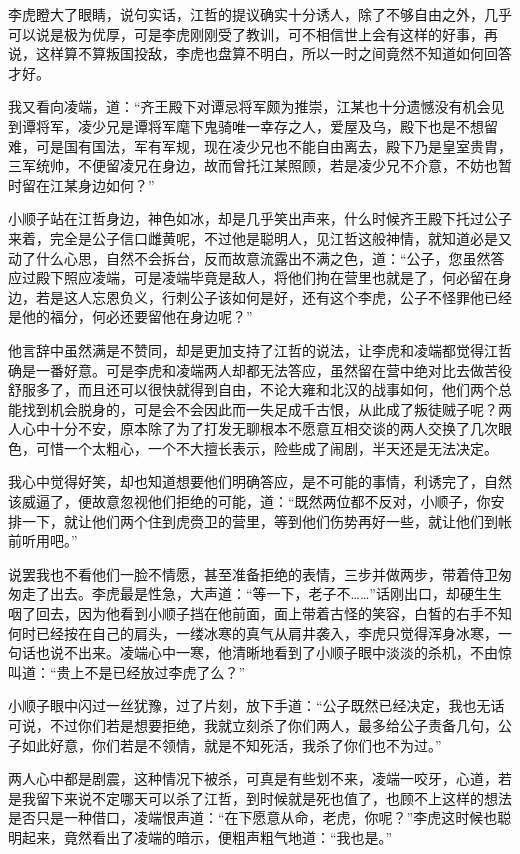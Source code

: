 李虎瞪大了眼睛，说句实话，江哲的提议确实十分诱人，除了不够自由之外，几乎可以说是极为优厚，可是李虎刚刚受了教训，可不相信世上会有这样的好事，再说，这样算不算叛国投敌，李虎也盘算不明白，所以一时之间竟然不知道如何回答才好。

我又看向凌端，道：“齐王殿下对谭忌将军颇为推崇，江某也十分遗憾没有机会见到谭将军，凌少兄是谭将军麾下鬼骑唯一幸存之人，爱屋及乌，殿下也是不想留难，可是国有国法，军有军规，现在凌少兄也不能自由离去，殿下乃是皇室贵胄，三军统帅，不便留凌兄在身边，故而曾托江某照顾，若是凌少兄不介意，不妨也暂时留在江某身边如何？”

小顺子站在江哲身边，神色如冰，却是几乎笑出声来，什么时候齐王殿下托过公子来着，完全是公子信口雌黄呢，不过他是聪明人，见江哲这般神情，就知道必是又动了什么心思，自然不会拆台，反而故意流露出不满之色，道：“公子，您虽然答应过殿下照应凌端，可是凌端毕竟是敌人，将他们拘在营里也就是了，何必留在身边，若是这人忘恩负义，行刺公子该如何是好，还有这个李虎，公子不怪罪他已经是他的福分，何必还要留他在身边呢？”

他言辞中虽然满是不赞同，却是更加支持了江哲的说法，让李虎和凌端都觉得江哲确是一番好意。可是李虎和凌端两人却都无法答应，虽然留在营中绝对比去做苦役舒服多了，而且还可以很快就得到自由，不论大雍和北汉的战事如何，他们两个总能找到机会脱身的，可是会不会因此而一失足成千古恨，从此成了叛徒贼子呢？两人心中十分不安，原本除了为了打发无聊根本不愿意互相交谈的两人交换了几次眼色，可惜一个太粗心，一个不大擅长表示，险些成了闹剧，半天还是无法决定。

我心中觉得好笑，却也知道想要他们明确答应，是不可能的事情，利诱完了，自然该威逼了，便故意忽视他们拒绝的可能，道：“既然两位都不反对，小顺子，你安排一下，就让他们两个住到虎赍卫的营里，等到他们伤势再好一些，就让他们到帐前听用吧。”

说罢我也不看他们一脸不情愿，甚至准备拒绝的表情，三步并做两步，带着侍卫匆匆走了出去。李虎最是性急，大声道：“等一下，老子不……”话刚出口，却硬生生咽了回去，因为他看到小顺子挡在他前面，面上带着古怪的笑容，白皙的右手不知何时已经按在自己的肩头，一缕冰寒的真气从肩井袭入，李虎只觉得浑身冰寒，一句话也说不出来。凌端心中一寒，他清晰地看到了小顺子眼中淡淡的杀机，不由惊叫道：“贵上不是已经放过李虎了么？”

小顺子眼中闪过一丝犹豫，过了片刻，放下手道：“公子既然已经决定，我也无话可说，不过你们若是想要拒绝，我就立刻杀了你们两人，最多给公子责备几句，公子如此好意，你们若是不领情，就是不知死活，我杀了你们也不为过。”

两人心中都是剧震，这种情况下被杀，可真是有些划不来，凌端一咬牙，心道，若是我留下来说不定哪天可以杀了江哲，到时候就是死也值了，也顾不上这样的想法是否只是一种借口，凌端恨声道：“在下愿意从命，老虎，你呢？”李虎这时候也聪明起来，竟然看出了凌端的暗示，便粗声粗气地道：“我也是。”

